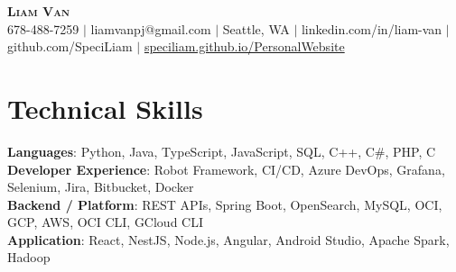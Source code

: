 \documentclass[letterpaper,11pt]{article}
\begin{document}

%
\begin{center}
    \textbf{\Huge \scshape Liam Van} \\ \vspace{1pt}
    \small 678-488-7259 $|$ \small {liamvanpj@gmail.com} $|$ Seattle, WA
 {{$|$ linkedin.com/in/liam-van} {$|$ github.com/SpeciLiam} {$|$ \href{https://speciliam.github.io/PersonalWebsite}{speciliam.github.io/PersonalWebsite}}}

\end{center}

\section{Technical Skills}
 \begin{itemize}[leftmargin=0.15in, label={}]
    \small{\item{
     \textbf{Languages}{: Python, Java, TypeScript, JavaScript, SQL, C++, C\#, PHP, C} \\
     \textbf{Developer Experience}{: Robot Framework, CI/CD, Azure DevOps, Grafana, Selenium, Jira, Bitbucket, Docker} \\
     \textbf{Backend / Platform}{: REST APIs, Spring Boot, OpenSearch, MySQL, OCI, GCP, AWS, OCI CLI, GCloud CLI} \\
     \textbf{Application}{: React, NestJS, Node.js, Angular, Android Studio, Apache Spark, Hadoop} \\
    }}
 \end{itemize}
%
\end{document}
